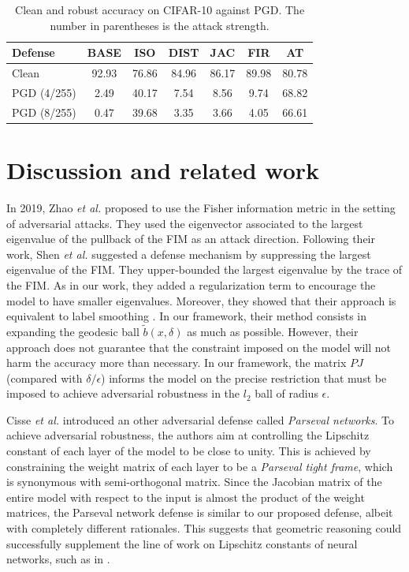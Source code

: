 \documentclass[entropy,article,submit,pdftex,moreauthors]{Definitions/mdpi}
\theoremstyle{plain}
\theoremstyle{definition}
\begin{document}
\begin{table}
\begin{center}\scriptsize
    \begin{tabular}{|l||c|c|c|c|c|c|}\hline
        \bf Defense & \bf BASE & \bf ISO & \bf DIST & \bf JAC & \bf FIR & \bf AT \\
        \hline
        \hline
        Clean & 92.93 & 76.86 & 84.96 & 86.17 & 89.98 & 80.78 \\
        \hline
        PGD (4/255) & 2.49 & 40.17 & 7.54 & 8.56 & 9.74 & 68.82 \\
        \hline
        PGD (8/255) & 0.47 & 39.68 & 3.35 & 3.66 & 4.05 & 66.61 \\
        \hline
    \end{tabular}
    \caption{Clean and robust accuracy on CIFAR-10 against PGD. The number in parentheses is the attack strength.}
    \label{tab:res}
\end{center}
\end{table}

\section{Discussion and related work}
\label{sec:dis}

In 2019, Zhao \emph{et al.} \citep{zhaoAdversarialAttackDetection2019} proposed to use the Fisher information metric in the setting of adversarial attacks. They used the eigenvector associated to the largest eigenvalue of the pullback of the FIM as an attack direction. Following their work, Shen \emph{et al.} \citep{shenDefendingAdversarialAttacks2019} suggested a defense mechanism by suppressing the largest eigenvalue of the FIM. They upper-bounded the largest eigenvalue by the trace of the FIM. As in our work, they added a regularization term to encourage the model to have smaller eigenvalues. Moreover, they showed that their approach is equivalent to label smoothing \citep{NEURIPS2019_f1748d6b}. In our framework, their method consists in expanding the geodesic ball $\tilde{b}(x, \delta)$ as much as possible. However, their approach does not guarantee that the constraint imposed on the model will not harm the accuracy more than necessary. In our framework, the matrix $PJ$ (compared with $\delta/\epsilon$) informs the model on the precise restriction that must be imposed to achieve adversarial robustness in the $l_2$ ball of radius $\epsilon$. 

Cisse \emph{et al.} \citep{cisseParsevalNetworksImproving2017} introduced an other adversarial defense called  \emph{Parseval networks}. To achieve adversarial robustness, the authors aim at controlling the Lipschitz constant of each layer of the model to be close to unity. This is achieved by constraining the weight matrix of each layer to be a \emph{Parseval tight frame}, which is synonymous with semi-orthogonal matrix. Since the Jacobian matrix of the entire model with respect to the input is almost the product of the weight matrices, the Parseval network defense is similar to our proposed defense, albeit with completely different rationales. This suggests that geometric reasoning could successfully supplement the line of work on Lipschitz constants of neural networks, such as in \citep{bethunePayAttentionYour2022}.
\end{document}

